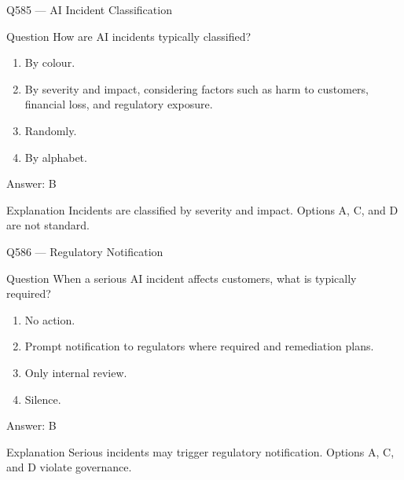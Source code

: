 \documentclass[aspectratio=169,8pt]{beamer}
\begin{document}
	\begin{frame}{Q585 --- AI Incident Classification}
		\begin{block}{Question}
			How are AI incidents typically classified?
			\begin{enumerate}
				\item By colour.
				\item By severity and impact, considering factors such as harm to customers, financial loss, and regulatory exposure.
				\item Randomly.
				\item By alphabet.
			\end{enumerate}
		\end{block}
		\begin{exampleblock}{Answer: B}\end{exampleblock}
		\begin{block}{Explanation}
			Incidents are classified by severity and impact. Options A, C, and D are not standard.
		\end{block}
	\end{frame}
	
	\begin{frame}{Q586 --- Regulatory Notification}
		\begin{block}{Question}
			When a serious AI incident affects customers, what is typically required?
			\begin{enumerate}
				\item No action.
				\item Prompt notification to regulators where required and remediation plans.
				\item Only internal review.
				\item Silence.
			\end{enumerate}
		\end{block}
		\begin{exampleblock}{Answer: B}\end{exampleblock}
		\begin{block}{Explanation}
			Serious incidents may trigger regulatory notification. Options A, C, and D violate governance.
		\end{block}
	\end{frame}
	
\end{document}
